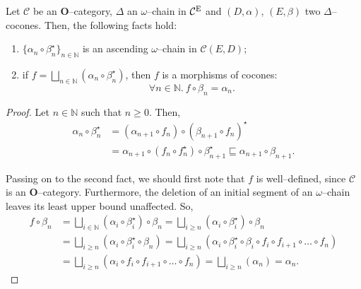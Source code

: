 \begin{lem}\label{lem:3-1}
  Let \(\mathcal{C}\) be an \(\mathbf{O}\)--category, \(\Delta\) an \(\omega\)--chain in \(\mathcal{C}^\textup{E}\) and \((D,\alpha)\), \((E,\beta)\) two \(\Delta\)--cocones. %
  Then, the following facts hold:
  \begin{enumerate}
    \item \(\lbrace \alpha_n \circ \beta_n^\star \rbrace_{n \in \mathbb{N}}\) is an ascending \(\omega\)--chain in \(\mathcal{C}(E,D)\); %
    \item if \(f = \bigsqcup_{n \in \mathbb{N}}(\alpha_n \circ \beta_n^\star)\), then \(f\) is a morphisms of cocones:
    \begin{equation*}
      \forall n \in \mathbb{N}.\: f \circ \beta_n = \alpha_n.
    \end{equation*}
  \end{enumerate}
\end{lem}
\begin{proof}
  Let \(n \in \mathbb{N}\) such that \(n \ge 0\). Then,
  \begin{equation*}
    \begin{split}
      \alpha_n \circ \beta_n^\star &=
      (\alpha_{n+1} \circ f_n) \circ {(\beta_{n+1} \circ f_n)}^\star \\
      &= \alpha_{n+1} \circ (f_n \circ f_n^\star) \circ \beta_{n+1}^\star
      \sqsubseteq \alpha_{n+1} \circ \beta_{n+1}.
    \end{split}
  \end{equation*}

  Passing on to the second fact, we should first note that \(f\) is well--defined, since \(\mathcal{C}\) is an \(\mathbf{O}\)--category. %
  Furthermore, the deletion of an initial segment of an \(\omega\)--chain leaves its least upper bound unaffected. %
  So,
  \begin{equation*}
    \begin{split}
      f \circ \beta_n &=
      \bigsqcup_{i \in \mathbb{N}}(\alpha_i \circ \beta_i^\star) \circ \beta_n
      = \bigsqcup_{i \ge n}(\alpha_i \circ \beta_i^\star) \circ \beta_n \\
      &= \bigsqcup_{i \ge n}(\alpha_i \circ \beta_i^\star \circ \beta_n)
      = \bigsqcup_{i \ge n}(\alpha_i \circ \beta_i^\star \circ \beta_i \circ f_i \circ f_{i+1} \circ \dotsc \circ f_n) \\
      &= \bigsqcup_{i \ge n}(\alpha_i \circ f_i \circ f_{i+1} \circ \dotsc \circ f_n)
      = \bigsqcup_{i \ge n}(\alpha_n) = \alpha_n.
    \end{split}
  \end{equation*}\qedhere
\end{proof}

